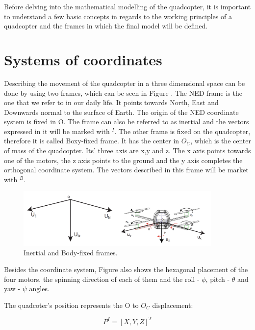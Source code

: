 Before delving into the mathematical modelling of the quadcopter, it is important to understand a few basic concepts in regards to the working principles of a quadcopter and the frames in which the final model will be defined.

\section{Systems of coordinates} \label{2.1} 
Describing the movement of the quadcopter in a three dimensional space can be done by using two frames, which can be seen in Figure \label{frames1}. The NED frame is the one that we refer to in our daily life. It points towards North, East and Downwards normal to the surface of Earth. The origin of the NED coordinate system is fixed in O. The frame can also be referred to as inertial and the vectors expressed in it will be marked with $^{I}$. The other frame is fixed on the quadcopter, therefore it is called Boxy-fixed frame. It has the center in $O_{C}$, which is the center of mass of the quadcopter. Its' three axis are x,y and z. The x axis points towards one of the motors, the z axis points to the ground and the y axis completes the orthogonal coordinate system. The vectors described in this frame will be market with $^{B}$. 


\begin{figure}[H]
  \centering
    \includegraphics[width=0.9\textwidth]{images/frames1.png}
	\caption{Inertial and Body-fixed frames.}
	\label{frames1}
\end{figure}

Besides the coordinate system, Figure \label{frames1} also shows the hexagonal placement of the four motors, the spinning direction of each of them and the roll - $\phi$, pitch - $\theta$ and yaw - $\psi$ angles. 

The quadcoter's position represents the O to $O_{C}$ displacement:

\begin{equation}
	P^{I}=[X, Y, Z] ^{T}
\end{equation} 

